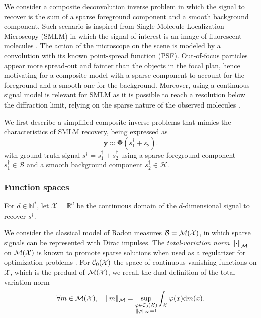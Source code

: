         We consider a composite deconvolution inverse problem in which the signal to recover is the sum of a sparse foreground component and a smooth background component.   
        Such scenario is inspired from Single Molecule Localization Microscopy (SMLM) in which the signal of interest is an image of fluorescent molecules \cite{sage2019smlm}.
        The action of the microscope on the scene is modeled by a convolution with its known point-spread function (PSF).
        Out-of-focus particles appear more spread-out and fainter than the objects in the focal plan, hence motivating for a composite model with a sparse component to account for the foreground and a smooth one for the background.
        Moreover, using a continuous signal model is relevant for SMLM as it is possible to reach a resolution below the diffraction limit, relying on the sparse nature of the observed molecules \cite{huang2017super,denoyelle2019sliding,laville2021sparse}.
        
        We first describe a simplified composite inverse problems that mimics the characteristics of SMLM recovery, being expressed as
        \begin{equation*}
            \bm{y} \approx \bm{\Phi}(s_1^\dagger + s_2^\dagger).
        \end{equation*}
        with ground truth signal $s^\dagger = s_1^\dagger + s_2^\dagger$ using a sparse foreground component $s_1^\dagger \in \mathcal{B}$ and a smooth background component $s_2^\dagger \in \mathcal{H}$.

        \subsubsection{Function spaces}
            For $d \in \mathbb{N}^*$, let $\mathcal{X} = \mathbb{R}^d$ be the continuous domain of the $d$-dimensional signal to recover $s^\dagger$. 

            We consider the classical model of Radon measures $\mathcal{B} = {\mathcal{M}}({\mathcal{X}})$, in which sparse signals can be represented with Dirac impulses. The \textit{total-variation norm} $\left\lVert\cdot\right\rVert_\mathcal{M}$ on ${\mathcal{M}}({\mathcal{X}})$ is known to promote sparse solutions when used as a regularizer for optimization problems \cite{unser2017splines}. For ${\mathcal{C}}_0({\mathcal{X}})$ the space of continuous vanishing functions on $\mathcal{X}$, which is the predual of ${\mathcal{M}}({\mathcal{X}})$, we recall the dual definition of the total-variation norm
            \begin{equation*}
                \forall m \in {\mathcal{M}}({\mathcal{X}}), \quad \lVert m \rVert_\mathcal{M} = \underset{\substack{\varphi \in {\mathcal{C}}_0({\mathcal{X}}) \\ \| \varphi \|_\infty = 1}}{\sup} \int_\mathcal{X} \varphi(x) \mathrm{d}m(x).
            \end{equation*}
            
